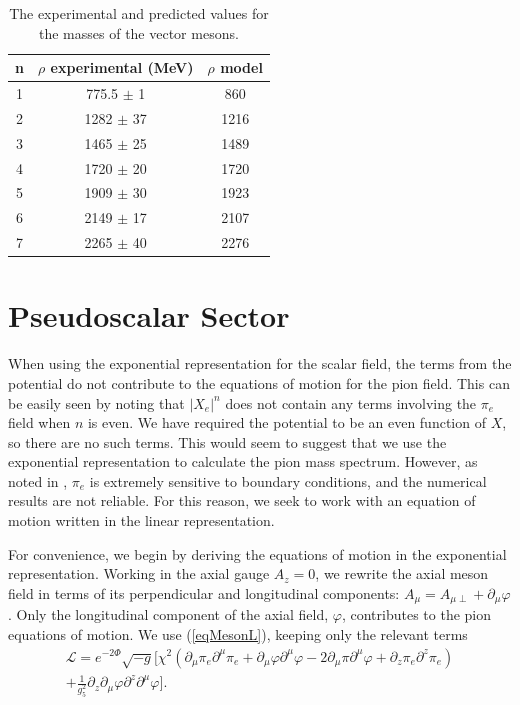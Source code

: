 \documentclass[aps,prd,12pt,nofootinbib]{revtex4}
\newcommand{\ba}{\begin{eqnarray}}
\newcommand{\ea}{\end{eqnarray}}
\newcommand{\cL}{\mathcal L}
\begin{document}
\begin{table}[htb]
\center
\begin{tabular}{| c || c | c  |}
\hline
n & $\rho$ experimental (MeV) & $\rho$ model \\
\hline
1 & 775.5 $\pm$  1 & 860	\\
2 & 1282 $\pm$ 37 & 1216 \\
3 & 1465 $\pm$ 25 & 1489 \\
4 &  1720 $\pm$ 20 & 1720 \\ 
5 &  1909 $\pm$ 30 & 1923 \\
6 &  2149 $\pm$  17& 2107 \\
7 &  2265 $\pm$  40& 2276 \\ 
\hline
\end{tabular}
\caption{The experimental and predicted values for the masses of the vector mesons.}
\label{tabRho}
\end{table}

\section{Pseudoscalar Sector}

When using the exponential representation for the scalar field, the terms from the potential do not contribute to the equations of motion for the pion field.
This can be easily seen by noting that $|X_e|^n$ does not contain any terms involving the $\pi_e$ field when $n$ is even. 
We have required the potential to be an even function of $X$, so there are no such terms.
This would seem to suggest that we use the exponential representation to calculate the pion mass spectrum.
However, as noted in \cite{bartz-pions}, $\pi_e$ is extremely sensitive to boundary conditions, and the numerical results are not reliable.
For this reason, we seek to work with an equation of motion written in the linear representation.

For convenience, we begin by deriving the equations of motion in the exponential representation.
Working in the axial gauge $A_z = 0$, we rewrite the axial meson field in terms of its perpendicular and longitudinal components: $A_\mu = A_{\mu\perp} +\partial_\mu \varphi$.
Only the longitudinal component of the axial field, $\varphi$, contributes to the pion equations of motion.
We use (\ref{eqMesonL}), keeping only the relevant terms
\ba
\cL = e^{-2\Phi} \sqrt{-g} [ \chi^2 (\partial_\mu \pi_e \partial^\mu \pi_e +  \partial_\mu \varphi \partial^\mu \varphi - 2 \partial_\mu \pi \partial^\mu \varphi +  \partial_z \pi_e \partial^z \pi_e)  \\ \nonumber
 + \frac{1}{g_5^2}\partial_z \partial_\mu \varphi \partial^z\partial^\mu \varphi ].
\ea
\end{document}
